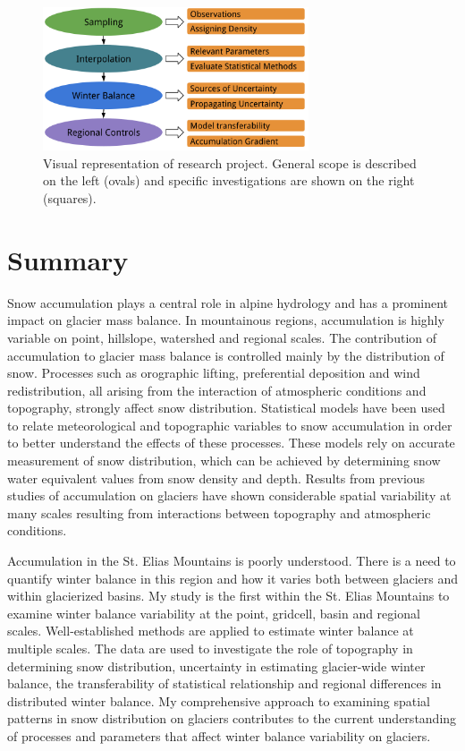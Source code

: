 \documentclass{sfuthesis}
\begin{document}
 \begin{figure}
 \centering
           \includegraphics[width =0.7\textwidth]{MastersFlow.png}
       \caption{Visual representation of research project. General scope is described on the left (ovals) and specific investigations are shown on the right (squares).}
       \label{fig:flowchart_project}
\end{figure}

\section{Summary}
Snow accumulation plays a central role in alpine hydrology and has a prominent impact on glacier mass balance. In mountainous regions, accumulation is highly variable on point, hillslope, watershed and regional scales. The contribution of accumulation to glacier mass balance is controlled mainly by the distribution of snow. Processes such as orographic lifting, preferential deposition and wind redistribution, all arising from the interaction of atmospheric conditions and topography, strongly affect snow distribution. Statistical models have been used to relate meteorological and topographic variables to snow accumulation in order to better understand the effects of these processes. These models rely on accurate measurement of snow distribution, which can be achieved by determining snow water equivalent values from snow density and depth. Results from previous studies of accumulation on glaciers have shown considerable spatial variability at many scales resulting from interactions between topography and atmospheric conditions. 

Accumulation in the St. Elias Mountains is poorly understood. There is a need to quantify winter balance in this region and how it varies both between glaciers and within glacierized basins. My study is the first within the St. Elias Mountains to examine winter balance variability at the point, gridcell, basin and regional scales. Well-established methods are applied to estimate winter balance at multiple scales. The data are used to investigate the role of topography in determining snow distribution, uncertainty in estimating glacier-wide winter balance, the transferability of statistical relationship and regional differences in distributed winter balance. My comprehensive approach to examining spatial patterns in snow distribution on glaciers contributes to the current understanding of processes and parameters that affect winter balance variability on glaciers. 
\end{document}

